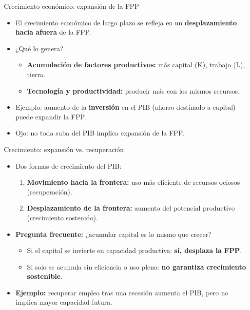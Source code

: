 \documentclass{beamer}
\begin{document}
\begin{frame}{Crecimiento económico: expansión de la FPP}
    \begin{itemize}
        \item El crecimiento económico de largo plazo se refleja en un \textbf{desplazamiento hacia afuera} de la FPP.
        \item ¿Qué lo genera?
        \begin{itemize}
            \item \textbf{Acumulación de factores productivos:} más capital (K), trabajo (L), tierra.
            \item \textbf{Tecnología y productividad:} producir más con los mismos recursos.
        \end{itemize}
        \item Ejemplo: aumento de la \textbf{inversión} en el PIB (ahorro destinado a capital) puede expandir la FPP.
        \item Ojo: no toda suba del PIB implica expansión de la FPP.
    \end{itemize}
\end{frame}

\begin{frame}{Crecimiento: expansión vs. recuperación}
    \begin{itemize}
        \item Dos formas de crecimiento del PIB:
        \begin{enumerate}
            \item \textbf{Movimiento hacia la frontera:} uso más eficiente de recursos ociosos (recuperación).
            \item \textbf{Desplazamiento de la frontera:} aumento del potencial productivo (crecimiento sostenido).
        \end{enumerate}
        \item \textbf{Pregunta frecuente:} ¿acumular capital es lo mismo que crecer?
        \begin{itemize}
            \item Si el capital se invierte en capacidad productiva: \textbf{sí, desplaza la FPP}.
            \item Si solo se acumula sin eficiencia o uso pleno: \textbf{no garantiza crecimiento sostenible}.
        \end{itemize}
        \item \textbf{Ejemplo:} recuperar empleo tras una recesión aumenta el PIB, pero no implica mayor capacidad futura.
    \end{itemize}
\end{frame}
\end{document}
